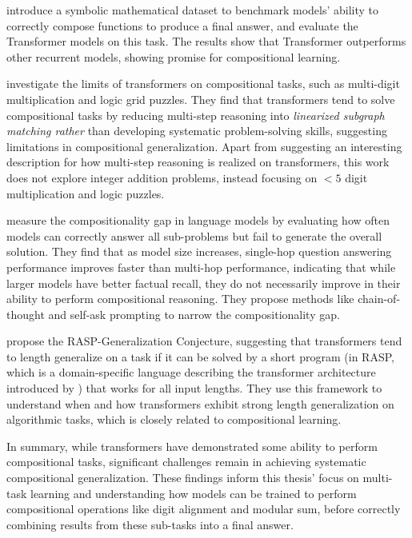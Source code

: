 \cite{saxton_analysing_2019} introduce a symbolic mathematical dataset to benchmark models' ability to correctly compose functions to produce a final answer, and evaluate the Transformer models on this task. The results show that Transformer outperforms other recurrent models, showing promise for compositional learning.

\cite{dziri_faith_2023} investigate the limits of transformers on compositional tasks, such as multi-digit multiplication and logic grid puzzles. They find that transformers tend to solve compositional tasks by reducing multi-step reasoning into \emph{linearized subgraph matching rather} than developing systematic problem-solving skills, suggesting limitations in compositional generalization. Apart from suggesting an interesting description for how multi-step reasoning is realized on transformers, this work does not explore integer addition problems, instead focusing on $<5$ digit multiplication and logic puzzles.

\cite{press_measuring_2023} measure the compositionality gap in language models by evaluating how often models can correctly answer all sub-problems but fail to generate the overall solution. They find that as model size increases, single-hop question answering performance improves faster than multi-hop performance, indicating that while larger models have better factual recall, they do not necessarily improve in their ability to perform compositional reasoning. They propose methods like chain-of-thought and self-ask prompting to narrow the compositionality gap.

\cite{zhou_what_2023} propose the RASP-Generalization Conjecture, suggesting that transformers tend to length generalize on a task if it can be solved by a short program (in RASP, which is a domain-specific language describing the transformer architecture introduced by \cite{weiss_thinking_2021}) that works for all input lengths. They use this framework to understand when and how transformers exhibit strong length generalization on algorithmic tasks, which is closely related to compositional learning.

In summary, while transformers have demonstrated some ability to perform compositional tasks, significant challenges remain in achieving systematic compositional generalization. These findings inform this thesis' focus on multi-task learning and understanding how models can be trained to perform compositional operations like digit alignment and modular sum, before correctly combining results from these sub-tasks into a final answer.

